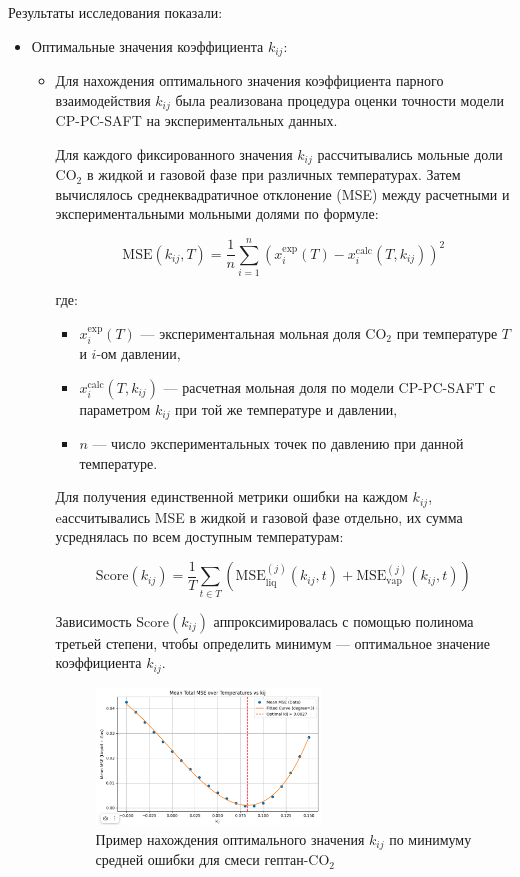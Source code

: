 \documentclass[a4paper,12pt]{article}
\begin{document}
Результаты исследования показали:
\begin{itemize}
    \item Оптимальные значения коэффициента \( k_{ij} \):
    \begin{itemize}

\item Для нахождения оптимального значения коэффициента парного взаимодействия \( k_{ij} \) была реализована процедура оценки точности модели CP-PC-SAFT на экспериментальных данных.

Для каждого фиксированного значения \( k_{ij} \) рассчитывались мольные доли $ \mathrm{CO}_2 $ в жидкой и газовой фазе при различных температурах. Затем вычислялось среднеквадратичное отклонение (MSE) между расчетными и экспериментальными мольными долями по формуле:

\[
\mathrm{MSE}(k_{ij}, T) = \frac{1}{n} \sum_{i=1}^{n} \left(x_{i}^{\text{exp}}(T) - x_{i}^{\text{calc}}(T, k_{ij})\right)^2
\]

где:
\begin{itemize}
    \item $x_{i}^{\text{exp}}(T)$ — экспериментальная мольная доля $ \mathrm{CO}_2 $ при температуре $T$ и $i$-ом давлении,
    \item $x_{i}^{\text{calc}}(T, k_{ij})$ — расчетная мольная доля по модели CP-PC-SAFT с параметром $k_{ij}$ при той же температуре и давлении,
    \item $n$ — число экспериментальных точек по давлению при данной температуре.
\end{itemize}

Для получения единственной метрики ошибки на каждом \( k_{ij} \), eассчитывались MSE в жидкой и газовой фазе отдельно, их сумма усреднялась по всем доступным температурам:

\[
\mathrm{Score}(k_{ij}) = \frac{1}{T} \sum_{t\in T}^{} \left( \mathrm{MSE}_\text{liq}^{(j)}(k_{ij}, t) + \mathrm{MSE}_\text{vap}^{(j)}(k_{ij}, t) \right)
\]

Зависимость $\mathrm{Score}(k_{ij})$ аппроксимировалась с помощью полинома третьей степени, чтобы определить минимум — оптимальное значение коэффициента \( k_{ij} \).

\vspace{1em}
\begin{figure}[ht]
    \centering
    \includegraphics[width=0.6\textwidth]{images/best_kij_heptane.png}
    \caption{Пример нахождения оптимального значения $k_{ij}$ по минимуму средней ошибки для смеси гептан-$ \mathrm{CO}_2 $}
    \label{fig:kij_optimization}
\end{figure}
\vspace{1em}


\end{itemize}
\end{itemize}
\end{document}
